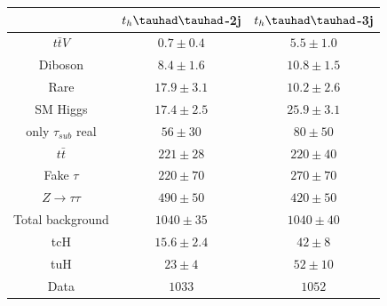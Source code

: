 \begin{table}[htbp]
\begin{tabular}{ccc} \toprule\toprule
& $t_{h}\thadhad$-2j & $t_{h}\thadhad$-3j\\\midrule
  $t\bar{t}V$              & $0.7 \pm 0.4 $ & $5.5 \pm 1.0 $  \\
  Diboson                  & $8.4 \pm 1.6 $ & $10.8 \pm 1.5$  \\
  Rare                     & $17.9 \pm 3.1$ & $10.2 \pm 2.6$  \\ 
  SM Higgs                 & $17.4 \pm 2.5$ & $25.9 \pm 3.1$  \\ 
  only $\tau_{sub}$ real   & $56 \pm 30   $ & $80 \pm 50   $  \\  
  $t\bar{t}$               & $221 \pm 28  $ & $220 \pm 40  $  \\
  Fake $\tau$              & $220 \pm 70  $ & $270 \pm 70  $  \\  
  $Z\rightarrow\tau\tau$   & $490 \pm 50  $ & $420 \pm 50  $  \\ 
  Total background         & $1040 \pm 35 $ & $1040 \pm 40 $  \\ \midrule
  tcH                      & $15.6 \pm 2.4$ & $42 \pm 8    $  \\ 
  tuH                      & $23 \pm 4    $ & $52 \pm 10   $  \\ \midrule
  Data                     & $1033       $& $1052 $       \\
\bottomrule\bottomrule
\end{tabular}
\label{tab:HtautauPostfitYieldsUnblind}
\end{table}




